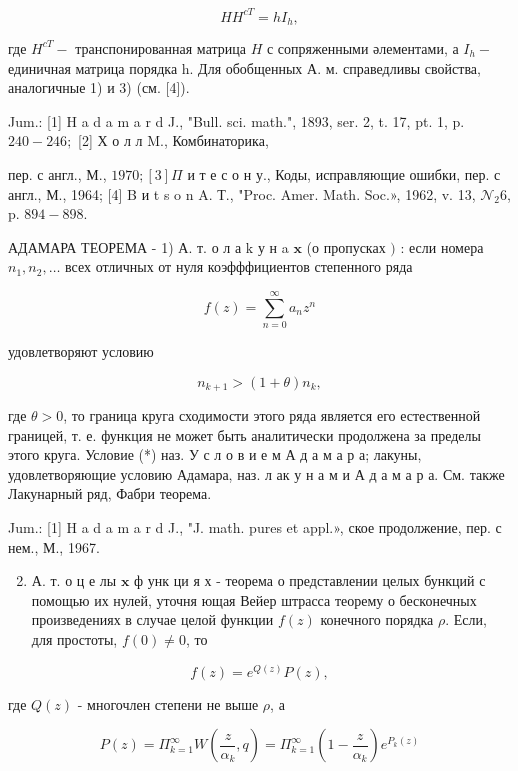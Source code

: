 \documentclass[10pt]{article}
\begin{document}
\[

H H^{c T}=h I_{h},

\]



где $H^{c T}-$ транспонированная матрица $H$ с сопряженными әлементами, а $I_{h}-$ единичная матрица порядка h. Для обобщенных А. м. справедливы свойства, аналогичные 1) и 3) (см. [4]).



Jum.: [1] H a d a m a r d J., "Bull. sci. math.", 1893, ser. 2, t. 17, pt. 1, p. $240-246 ;$ [2] Х о л л M., Комбинаторика,

пер. с англ., М., $1970 ;[3] \Pi$ и т е с о н у., Коды, исправляющие ошибки, пер. с англ., М., 1964; [4] B и t s o n A. Т., "Proc. Amer. Math. Soc.», 1962, v. 13, $\mathcal{N}_{2} 6$, p. $894-898$.



АДАМАРА ТЕОРЕМА - 1) А. т. о л а $\mathrm{k}$ у н a $\mathbf{x}$ (о пропусках $)$ : если номера $n_{1}, n_{2}, \ldots$ всех отличных от нуля коэфффициентов степенного ряда



\[

f(z)=\sum_{n=0}^{\infty} a_{n} z^{n}

\]



удовлетворяют условию



\[

n_{k+1}>(1+\theta) n_{k},

\]



где $\theta>0$, то граница круга сходимости этого ряда является его естественной границей, т. е. функция не может быть аналитически продолжена за пределы этого круга. Условие (*) наз. У с л о в и е м А д а м а р а; лакуны, удовлетворяющие условию Адамара, наз. л ак у н а м и А д а м а р а. См. также Лакунарный ряд, Фабри теорема.



Jum.: [1] H a d a m a r d J., "J. math. pures et appl.», ское продолжение, пер. с нем., М., 1967.



\begin{enumerate}

  \setcounter{enumi}{1}

  \item А. т. $о$ ц е лы $\mathbf{x}$ ф унк ци я х - теорема о представлении целых бункций с помощью их нулей, уточня ющая Вейер штрасса теорему о бесконечных произведениях в случае целой функции $f(z)$ конечного порядка $\rho$. Если, для простоты, $f(0) \neq 0$, то

\end{enumerate}



\[

f(z)=e^{Q(z)} P(z),

\]



где $Q(z)$ - многочлен степени не выше $\rho$, а



\[

P(z)=\Pi_{k=1}^{\infty} W\left(\frac{z}{\alpha_{k}}, q\right)=\Pi_{k=1}^{\infty}\left(1-\frac{z}{\alpha_{k}}\right) e^{P_{k}(z)}

\]
\end{document}
